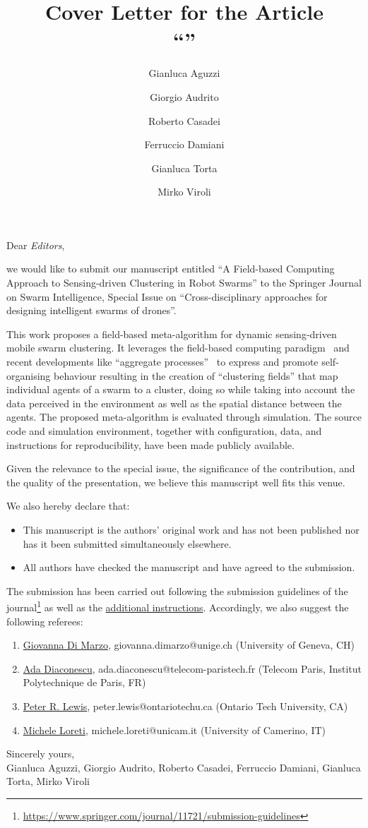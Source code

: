 \documentclass{article}
\title{Cover Letter for the Article\\
``\theTitle''}
\author{Gianluca Aguzzi \and Giorgio Audrito \and Roberto Casadei \and Ferruccio Damiani \and Gianluca Torta \and Mirko Viroli}
\newcommand{\theTitle}{A Field-based Computing Approach to Sensing-driven Clustering in Robot Swarms}
\newcommand{\thePublisher}{Springer}
\newcommand{\theJournal}{Swarm Intelligence}
\newcommand{\theSI}{Cross-disciplinary approaches for designing intelligent swarms of drones}
\begin{document}
\maketitle

Dear \emph{Editors},

we would like to submit our manuscript entitled ``\theTitle{}''
to the \thePublisher{} Journal on \theJournal{}, Special Issue on ``\theSI{}''.

This work proposes a field-based meta-algorithm
 for dynamic sensing-driven mobile swarm clustering.
%
It leverages the field-based computing paradigm~\cite{DBLP:journals/jlap/ViroliBDACP19} and recent developments like ``aggregate processes''~\cite{DBLP:journals/eaai/CasadeiVAPD21} to express and promote self-organising behaviour
 resulting in the creation of ``clustering fields''
 that map individual agents of a swarm to a cluster,
 doing so while taking into account the data perceived in the environment
 as well as the spatial distance between the agents.
%
The proposed meta-algorithm is evaluated through simulation.
%
The source code and simulation environment, together with configuration, data, and instructions for reproducibility,
 have been made publicly available.
%

Given the relevance to the special issue, 
 the significance of the contribution,
 and the quality of the presentation,
 we believe this manuscript
 well fits this venue.

We also hereby declare that:
%
\begin{itemize}
\item This manuscript is the authors' original work and has not been published nor has it been submitted simultaneously elsewhere.
\item All authors have checked the manuscript and have agreed to the submission. 
\end{itemize}
%
The submission has been carried out following the submission guidelines of the journal\footnote{\url{https://www.springer.com/journal/11721/submission-guidelines}} as well as the \href{https://media.springer.com/full/springer-instructions-for-authors-assets/pdf/1593723_Additional_submission_instructions.pdf}{additional instructions}. Accordingly, we also suggest the following referees:
%
\begin{enumerate}
\item \href{https://www.unige.ch/cui/cas/people/gdm}{Giovanna Di Marzo}, giovanna.dimarzo@unige.ch (University of Geneva, CH)
\item \href{http://adadiaconescu.there-you-are.com/}{Ada Diaconescu}, ada.diaconescu@telecom-paristech.fr
 (Telecom Paris, Institut Polytechnique de Paris, FR)
\item \href{https://www.petelewis.com/}{Peter R. Lewis}, peter.lewis@ontariotechu.ca (Ontario Tech University, CA)
\item \href{http://www.micheleloreti.com/}{Michele Loreti}, michele.loreti@unicam.it (University of Camerino, IT)
\end{enumerate}

Sincerely yours,\\
Gianluca Aguzzi, Giorgio Audrito, Roberto Casadei, Ferruccio Damiani, Gianluca Torta, Mirko Viroli





\end{document}
